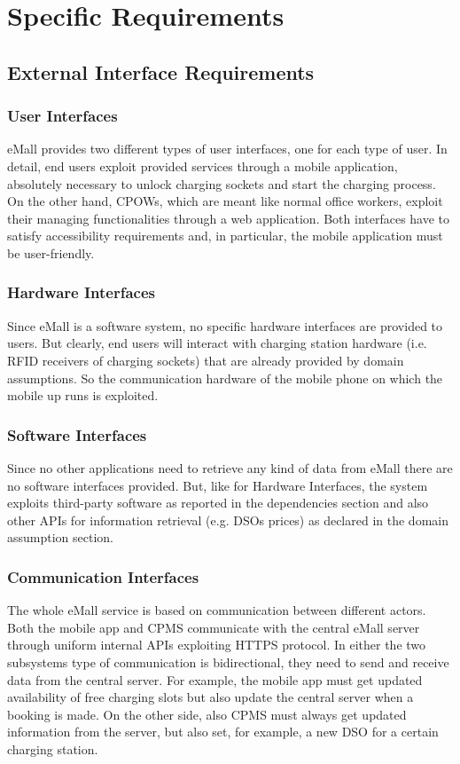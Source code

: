 \documentclass[a4paper]{report}
\begin{document}
\chapter{Specific Requirements}
\section{External Interface Requirements}
\subsection{User Interfaces}
eMall provides two different types of user interfaces, one for each type of user. In detail, end users exploit provided services through a mobile application, absolutely necessary to unlock charging sockets and start the charging process. On the other hand, CPOWs, which are meant like normal office workers, exploit their managing functionalities through a web application. Both interfaces have to satisfy accessibility requirements and, in particular, the mobile application must be user-friendly.
\subsection{Hardware Interfaces}
Since eMall is a software system, no specific hardware interfaces are provided to users. But clearly, end users will interact with charging station hardware (i.e. RFID receivers of charging sockets) that are already provided by domain assumptions. So the communication hardware of the mobile phone on which the mobile up runs is exploited.
\subsection{Software Interfaces}
Since no other applications need to retrieve any kind of data from eMall there are no software interfaces provided. But, like for Hardware Interfaces, the system exploits third-party software as reported in the dependencies section and also other APIs for information retrieval (e.g. DSOs prices) as declared in the domain assumption section.
\subsection{Communication Interfaces}
The whole eMall service is based on communication between different actors. Both the mobile app and CPMS communicate with the central eMall server through uniform internal APIs exploiting HTTPS protocol. In either the two subsystems type of communication is bidirectional, they need to send and receive data from the central server. For example, the mobile app must get updated availability of free charging slots but also update the central server when a booking is made. On the other side, also CPMS must always get updated information from the server, but also set, for example, a new DSO for a certain charging station. 
\end{document}

